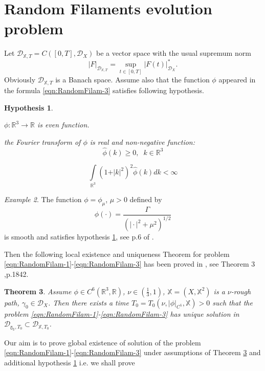 \documentclass[11pt,a4paper,leqno]{amsart}%
\theoremstyle{plain}
\newtheorem{theorem}{Theorem}[section]
\theoremstyle{remark}
\newtheorem{example}[theorem]{Example}
\theoremstyle{plain}
\newtheorem{hypothesis}[theorem]{Hypothesis}
\numberwithin{equation}{section}
\def\Rnu{{\mathbb R}}
\def\supl{\sup\limits}
\def\intl{\int\limits}
\def\supl{\mathop{\sup}\limits}
\begin{document}
\section{Random Filaments evolution problem}
Let $\mathcal{D}_{\mathbb{X},T}=C([0,T],\mathcal{D}_X)$ be a
vector space with the usual supremum norm
\begin{equation}
\vert F\vert_{\mathcal{D}_{\mathbb{X},T}}=\supl_{t\in[0,T]}\vert F(t)\vert_{\mathcal{D}_X}^*\label{eqn:NormDef}.
\end{equation}
Obviously $\mathcal{D}_{\mathbb{X},T}$ is a Banach space. Assume
also that the function $\phi$ appeared in the formula
\eqref{eqn:RandomFilam-3} satisfies following hypothesis.
\begin{hypothesis}\label{hyp:PhiAssumptions}
\begin{trivlist}
\item[(i)]$\phi:\mathbb{R}^3\to\mathbb{R}$ is even function.
\item[(ii)] the Fourier transform of $\phi$ is real and
non-negative function:
$$
\hat{\phi}(k)\geq 0,\;\;k\in\Rnu^3
$$
\item[(iii)]
$$
\intl_{\Rnu^3}(1+\vert k\vert^2)^2\hat{\phi}(k)dk<\infty
$$
\end{trivlist}
\end{hypothesis}
\begin{example}
The function $\phi=\phi_\mu$, $\mu>0$ defined by
$$\phi(\cdot)=\frac{\Gamma}{(\vert \cdot\vert^2+\mu^2)^{1/2}}$$
is smooth and satisfies hypothesis \ref{hyp:PhiAssumptions}, see p.6
of \cite{[Bers+Gub_2007]}.
\end{example}
Then the following local existence and uniqueness Theorem for
problem \eqref{eqn:RandomFilam-1}-\eqref{eqn:RandomFilam-3} has
been proved in \cite{[Bess+Gub_2005]}, see Theorem
$3$,p.1842.
\begin{theorem}\label{thm:LocalExistUniq}
Assume $\phi\in C^6(\Rnu^3,\Rnu)$, $\nu\in (\frac{1}{3},1)$,
$\mathbb{X}=(X,\mathbb{X}^2)$ is a $\nu$-rough path, $\gamma_0\in
\mathcal{D}_X$. Then there exists a time
$T_0=T_0(\nu,\vert \phi\vert_{C^5},\mathbb{X})>0$ such that the problem
\eqref{eqn:RandomFilam-1}-\eqref{eqn:RandomFilam-3} has unique
solution in $\mathcal{D}_{\mathbb{\gamma_0},T_0}\subset\mathcal{D}_{\mathbb{X},T_0}$.
\end{theorem}
Our aim is to prove global existence of solution of the problem
\eqref{eqn:RandomFilam-1}-\eqref{eqn:RandomFilam-3} under
assumptions of Theorem \ref{thm:LocalExistUniq} and additional
hypothesis \ref{hyp:PhiAssumptions} i.e. we shall prove
\end{document}
